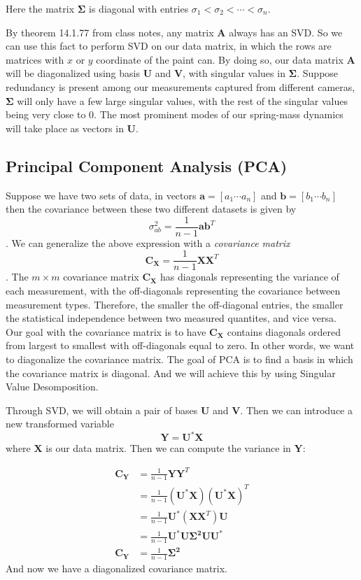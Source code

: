 \documentclass[12pt, a4paper]{article}
\begin{document}
Here the matrix $\mathbf{\Sigma}$ is diagonal with entries $\sigma_1 < \sigma_2 < \cdots < \sigma_n$.

By theorem 14.1.77 from class notes, any matrix $\mathbf{A}$ always has an SVD. So we can use this fact to perform SVD on our data matrix, in which the rows are matrices with $x$ or $y$ coordinate of the paint can. By doing so, our data matrix $\mathbf{A}$ will be diagonalized using basis $\mathbf{U}$ and $\mathbf{V}$, with singular values in $\mathbf{\Sigma}$. Suppose redundancy is present among our measurements captured from different cameras, $\mathbf{\Sigma}$ will only have a few large singular values, with the rest of the singular values being very close to 0. The most prominent modes of our spring-mass dynamics will take place as vectors in $\mathbf{U}$.


\subsection{Principal Component Analysis (PCA)}
Suppose we have two sets of data, in vectors $\mathbf{a} = [a_1 \cdots a_n]$ and $\mathbf{b} = [b_1 \cdots b_n]$\\
then the covariance between these two different datasets is given by 
$$\sigma^2_{ab} = \frac{1}{n-1}\mathbf{ab}^T$$.
We can generalize the above expression with a \textit{covariance matrix} 
$$\mathbf{C}_{\mathbf{X}} = \frac{1}{n-1} \mathbf{XX}^T$$.
The $m \times m$ covariance matrix $\mathbf{C}_{\mathbf{X}}$ has diagonals representing the variance of each measurement, with the off-diagonals representing the covariance between measurement types. Therefore, the smaller the off-diagonal entries, the smaller the statistical independence between two measured quantites, and vice versa.\\ 

Our goal with the covariance matrix is to have $\mathbf{C}_{\mathbf{X}}$ contains diagonals ordered from largest to smallest with off-diagonals equal to zero. In other words, we want to diagonalize the covariance matrix. The goal of PCA is to find a basis in which the covariance matrix is diagonal. And we will achieve this by using Singular Value Desomposition.

Through SVD, we will obtain a pair of bases $\mathbf{U}$ and $\mathbf{V}$. Then we can introduce a new transformed variable
$$\mathbf{Y} = \mathbf{U}^* \mathbf{X}$$
where $\mathbf{X}$ is our data matrix. Then we can compute the variance in $\mathbf{Y}$:

\begin{align*}
\mathbf{C_Y} &= \frac{1}{n-1}\mathbf{YY}^T\\
&= \frac{1}{n-1}(\mathbf{U^*X})(\mathbf{U^*X})^T\\
&= \frac{1}{n-1} \mathbf{U^*}(\mathbf{XX}^T)\mathbf{U}\\
&= \frac{1}{n-1} \mathbf{U^*U\Sigma^2UU^*}\\
\mathbf{C_Y} &= \frac{1}{n - 1}\mathbf{\Sigma^2}
\end{align*}
And now we have a diagonalized covariance matrix.
\end{document}
